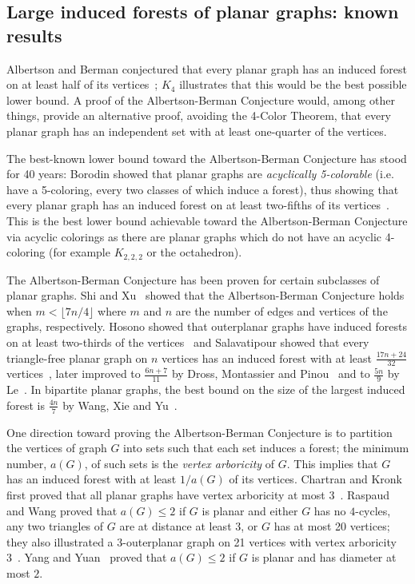 \documentclass[11pt]{article}
\begin{document}
\subsection{Large induced forests of planar graphs: known results}
 Albertson and Berman conjectured that every planar graph has an induced forest on at least half of its vertices~\cite{AB}; $K_4$ illustrates that this would be the best possible lower bound.  A proof of the Albertson-Berman Conjecture would, among other things, provide an alternative proof, avoiding the 4-Color Theorem, that every planar graph has an independent set with at least one-quarter of the vertices.

The best-known lower bound toward the Albertson-Berman Conjecture has stood for 40 years: Borodin showed that planar graphs are {\em acyclically 5-colorable} (i.e. have a 5-coloring, every two classes of which induce a forest), thus showing that every planar graph has an induced forest on at least two-fifths of its vertices~\cite{Borodin79}.  This is the best lower bound achievable toward the Albertson-Berman Conjecture via acyclic colorings as there are planar graphs which do not have an acyclic 4-coloring (for example $K_{2,2,2}$ or the octahedron). 

The Albertson-Berman Conjecture has been proven for certain subclasses of planar graphs. Shi and Xu~\cite{SX16} showed that the  Albertson-Berman Conjecture holds when $m < \lfloor 7n/4 \rfloor$ where $m$ and $n$ are the number of edges and vertices of the graphs, respectively. Hosono showed that outerplanar graphs have induced forests on at least two-thirds of the vertices~\cite{Hosono} and Salavatipour showed that every triangle-free planar graph on $n$ vertices has an induced forest with at least $\frac{17n+24}{32}$ vertices~\cite{Salavatipour}, later improved to $\frac{6n+7}{11}$ by Dross, Montassier and Pinou~\cite{DMP14} and to $\frac{5n}{9}$ by Le~\cite{Le16}. In bipartite planar graphs, the best bound on the size of the largest induced forest is $\frac{4n}{7}$ by Wang, Xie and Yu~\cite{WXY16}. 

One direction toward proving the Albertson-Berman Conjecture is to partition the vertices of graph $G$ into sets such that each set induces a forest; the minimum number, $a(G)$, of such sets is the {\em vertex arboricity} of $G$. This implies that $G$ has an induced forest with at least $1/a(G)$ of its vertices.
Chartran and Kronk first proved that all planar graphs have vertex arboricity at most 3~\cite{CK}. Raspaud and Wang proved that $a(G) \leq 2$ if $G$ is planar and either $G$ has no $4$-cycles, any two triangles of $G$ are at distance at least $3$, or $G$ has at most 20 vertices; they also illustrated a 3-outerplanar graph on 21 vertices with vertex arboricity 3~\cite{RW}. Yang and Yuan~\cite{YY07} proved that $a(G) \leq 2$ if $G$ is planar and has diameter at most $2$.
\end{document}
